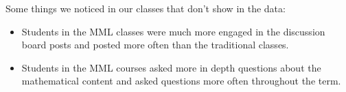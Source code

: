 Some things we noticed in our classes that don’t show in the data:
\begin{itemize}
  \item Students in the MML classes were much more engaged in the discussion board posts and posted more often than the traditional classes.
  \item Students in the MML courses asked more in depth questions about the mathematical content and asked questions more often throughout the term.
\end{itemize}










